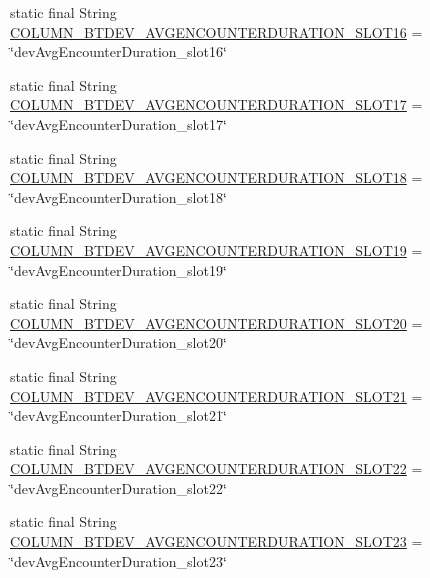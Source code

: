 \begin{DoxyCompactItemize}
\item 
static final String \hyperlink{classcs_1_1nsense_1_1db_1_1_n_sense_s_q_lite_helper_aefa4e03242dc91e4ce441bf0b0936178}{C\-O\-L\-U\-M\-N\-\_\-\-B\-T\-D\-E\-V\-\_\-\-A\-V\-G\-E\-N\-C\-O\-U\-N\-T\-E\-R\-D\-U\-R\-A\-T\-I\-O\-N\-\_\-\-S\-L\-O\-T16} = \char`\"{}dev\-Avg\-Encounter\-Duration\-\_\-slot16\char`\"{}
\item 
static final String \hyperlink{classcs_1_1nsense_1_1db_1_1_n_sense_s_q_lite_helper_a183659b2ef2e1a2d36150b9e84e04879}{C\-O\-L\-U\-M\-N\-\_\-\-B\-T\-D\-E\-V\-\_\-\-A\-V\-G\-E\-N\-C\-O\-U\-N\-T\-E\-R\-D\-U\-R\-A\-T\-I\-O\-N\-\_\-\-S\-L\-O\-T17} = \char`\"{}dev\-Avg\-Encounter\-Duration\-\_\-slot17\char`\"{}
\item 
static final String \hyperlink{classcs_1_1nsense_1_1db_1_1_n_sense_s_q_lite_helper_a0b5f29f21cf17f536bb4ae191e040417}{C\-O\-L\-U\-M\-N\-\_\-\-B\-T\-D\-E\-V\-\_\-\-A\-V\-G\-E\-N\-C\-O\-U\-N\-T\-E\-R\-D\-U\-R\-A\-T\-I\-O\-N\-\_\-\-S\-L\-O\-T18} = \char`\"{}dev\-Avg\-Encounter\-Duration\-\_\-slot18\char`\"{}
\item 
static final String \hyperlink{classcs_1_1nsense_1_1db_1_1_n_sense_s_q_lite_helper_a0ae214906e5fdc66a00c2b5f2771ca65}{C\-O\-L\-U\-M\-N\-\_\-\-B\-T\-D\-E\-V\-\_\-\-A\-V\-G\-E\-N\-C\-O\-U\-N\-T\-E\-R\-D\-U\-R\-A\-T\-I\-O\-N\-\_\-\-S\-L\-O\-T19} = \char`\"{}dev\-Avg\-Encounter\-Duration\-\_\-slot19\char`\"{}
\item 
static final String \hyperlink{classcs_1_1nsense_1_1db_1_1_n_sense_s_q_lite_helper_a553da8f0e3082738bd9fe051ab40e362}{C\-O\-L\-U\-M\-N\-\_\-\-B\-T\-D\-E\-V\-\_\-\-A\-V\-G\-E\-N\-C\-O\-U\-N\-T\-E\-R\-D\-U\-R\-A\-T\-I\-O\-N\-\_\-\-S\-L\-O\-T20} = \char`\"{}dev\-Avg\-Encounter\-Duration\-\_\-slot20\char`\"{}
\item 
static final String \hyperlink{classcs_1_1nsense_1_1db_1_1_n_sense_s_q_lite_helper_a528a19b3974495bed3ac33c1d638ca5d}{C\-O\-L\-U\-M\-N\-\_\-\-B\-T\-D\-E\-V\-\_\-\-A\-V\-G\-E\-N\-C\-O\-U\-N\-T\-E\-R\-D\-U\-R\-A\-T\-I\-O\-N\-\_\-\-S\-L\-O\-T21} = \char`\"{}dev\-Avg\-Encounter\-Duration\-\_\-slot21\char`\"{}
\item 
static final String \hyperlink{classcs_1_1nsense_1_1db_1_1_n_sense_s_q_lite_helper_afd369ed86e5e3f1e23acd11fabe385ab}{C\-O\-L\-U\-M\-N\-\_\-\-B\-T\-D\-E\-V\-\_\-\-A\-V\-G\-E\-N\-C\-O\-U\-N\-T\-E\-R\-D\-U\-R\-A\-T\-I\-O\-N\-\_\-\-S\-L\-O\-T22} = \char`\"{}dev\-Avg\-Encounter\-Duration\-\_\-slot22\char`\"{}
\item 
static final String \hyperlink{classcs_1_1nsense_1_1db_1_1_n_sense_s_q_lite_helper_a0554b63beef7b9ee6c6f5e4e567a1048}{C\-O\-L\-U\-M\-N\-\_\-\-B\-T\-D\-E\-V\-\_\-\-A\-V\-G\-E\-N\-C\-O\-U\-N\-T\-E\-R\-D\-U\-R\-A\-T\-I\-O\-N\-\_\-\-S\-L\-O\-T23} = \char`\"{}dev\-Avg\-Encounter\-Duration\-\_\-slot23\char`\"{}

\end{DoxyCompactItemize}
